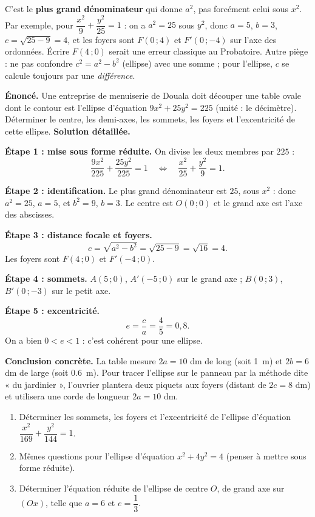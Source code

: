\documentclass[11pt]{article}
\begin{document}
\begin{attention}
C'est le \textbf{plus grand dénominateur} qui donne $a^2$, pas forcément celui sous $x^2$. Par exemple, pour $\dfrac{x^2}{9} + \dfrac{y^2}{25} = 1$ : on a $a^2 = 25$ sous $y^2$, donc $a = 5$, $b = 3$, $c = \sqrt{25-9} = 4$, et les foyers sont $F(0\,;4)$ et $F'(0\,;-4)$ sur l'axe des ordonnées. Écrire $F(4\,;0)$ serait une erreur classique au Probatoire. Autre piège : ne pas confondre $c^2 = a^2 - b^2$ (ellipse) avec une somme ; pour l'ellipse, $c$ se calcule toujours par une \emph{différence}.
\end{attention}

\begin{exoresolu}
\textbf{Énoncé.} Une entreprise de menuiserie de Douala doit découper une table ovale dont le contour est l'ellipse d'équation $9x^2 + 25y^2 = 225$ (unité : le décimètre). Déterminer le centre, les demi-axes, les sommets, les foyers et l'excentricité de cette ellipse.
\tcblower
\textbf{Solution détaillée.}

\textbf{Étape 1 : mise sous forme réduite.} On divise les deux membres par $225$ :
\[ \frac{9x^2}{225} + \frac{25y^2}{225} = 1 \quad \Longleftrightarrow \quad \frac{x^2}{25} + \frac{y^2}{9} = 1. \]

\textbf{Étape 2 : identification.} Le plus grand dénominateur est $25$, sous $x^2$ : donc $a^2 = 25$, $a = 5$, et $b^2 = 9$, $b = 3$. Le centre est $O(0\,;0)$ et le grand axe est l'axe des abscisses.

\textbf{Étape 3 : distance focale et foyers.}
\[ c = \sqrt{a^2 - b^2} = \sqrt{25 - 9} = \sqrt{16} = 4. \]
Les foyers sont $F(4\,;0)$ et $F'(-4\,;0)$.

\textbf{Étape 4 : sommets.} $A(5\,;0)$, $A'(-5\,;0)$ sur le grand axe ; $B(0\,;3)$, $B'(0\,;-3)$ sur le petit axe.

\textbf{Étape 5 : excentricité.}
\[ e = \frac{c}{a} = \frac{4}{5} = 0{,}8. \]
On a bien $0 < e < 1$ : c'est cohérent pour une ellipse.

\textbf{Conclusion concrète.} La table mesure $2a = 10$ dm de long (soit \SI{1}{m}) et $2b = 6$ dm de large (soit \SI{0,6}{m}). Pour tracer l'ellipse sur le panneau par la méthode dite « du jardinier », l'ouvrier plantera deux piquets aux foyers (distant de $2c = 8$ dm) et utilisera une corde de longueur $2a = 10$ dm.
\end{exoresolu}

\begin{exercice}
\begin{enumerate}
\item Déterminer les sommets, les foyers et l'excentricité de l'ellipse d'équation $\dfrac{x^2}{169} + \dfrac{y^2}{144} = 1$.
\item Mêmes questions pour l'ellipse d'équation $x^2 + 4y^2 = 4$ (penser à mettre sous forme réduite).
\item Déterminer l'équation réduite de l'ellipse de centre $O$, de grand axe sur $(Ox)$, telle que $a = 6$ et $e = \dfrac{1}{3}$.
\end{enumerate}
\end{exercice}
\end{document}
